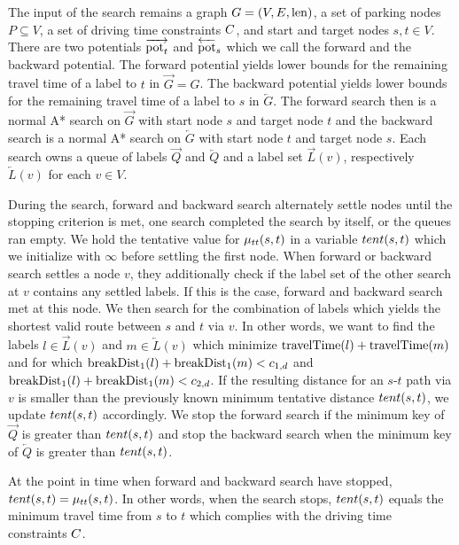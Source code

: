 The input of the search remains a graph $G=(V,E,\operatorname{len})$, a set of parking nodes $P \subseteq V$, a set of driving time constraints $C$, and start and target nodes $s,t \in V$. There are two potentials $\overrightarrow{\operatorname{pot}_t}$ and $\overleftarrow{\operatorname{pot}}_s$ which we call the forward and the backward potential. The forward potential yields lower bounds for the remaining travel time of a label to $t$ in $\overrightarrow{G}=G$. The backward potential yields lower bounds for the remaining travel time of a label to $s$ in $\overleftarrow{G}$. The forward search then is a normal A* search on $\overrightarrow{G}$ with start node $s$ and target node $t$ and the backward search is a normal A* search on $\overleftarrow{G}$ with start node $t$ and target node $s$. Each search owns a queue of labels $\overrightarrow{Q}$ and $\overleftarrow{Q}$ and a label set $\overrightarrow{L}(v)$, respectively $\overleftarrow{L}(v)$ for each $v \in V$.

During the search, forward and backward search alternately settle nodes until the stopping criterion is met, one search completed the search by itself, or the queues ran empty. We hold the tentative value for $\mu_{tt}(s,t)$ in a variable $tent(s,t)$ which we initialize with $\infty$ before settling the first node. When forward or backward search settles a node $v$, they additionally check if the label set of the other search at $v$ contains any settled labels. If this is the case, forward and backward search met at this node. We then search for the combination of labels which yields the shortest valid route between $s$ and $t$ via $v$. In other words, we want to find the labels $l \in \overrightarrow{L}(v)$ and $m \in \overleftarrow{L}(v)$ which minimize $\operatorname{travelTime}(l) + \operatorname{travelTime}(m)$ and for which $\operatorname{breakDist}_1(l) + \operatorname{breakDist}_1(m) < c_{1,d}$ and $\operatorname{breakDist}_1(l) + \operatorname{breakDist}_1(m) < c_{2,d}$. If the resulting distance for an $s$-$t$ path via $v$ is smaller than the previously known minimum tentative distance $tent(s,t)$, we update $tent(s,t)$ accordingly. We stop the forward search if the minimum key of $\overrightarrow{Q}$ is greater than $tent(s,t)$ and stop the backward search when the minimum key of $\overleftarrow{Q}$ is greater than $tent(s,t)$.

\begin{theorem}
	At the point in time when forward and backward search have stopped, $tent(s,t) = \mu_{tt}(s,t)$. In other words, when the search stops, $tent(s,t)$ equals the minimum travel time from $s$ to $t$ which complies with the driving time constraints $C$.
\end{theorem}

